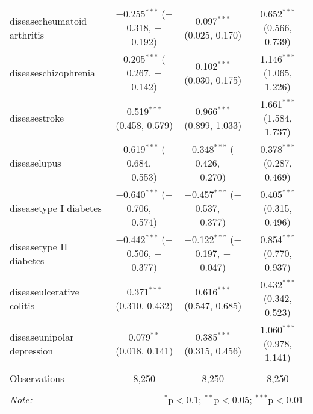 \begin{table}[!htbp]
\begin{tabular}{@{\extracolsep{5pt}}lccc}
  diseaserheumatoid arthritis & $-$0.255$^{***}$ ($-$0.318, $-$0.192) & 0.097$^{***}$ (0.025, 0.170) & 0.652$^{***}$ (0.566, 0.739) \\ 
  diseaseschizophrenia & $-$0.205$^{***}$ ($-$0.267, $-$0.142) & 0.102$^{***}$ (0.030, 0.175) & 1.146$^{***}$ (1.065, 1.226) \\ 
  diseasestroke & 0.519$^{***}$ (0.458, 0.579) & 0.966$^{***}$ (0.899, 1.033) & 1.661$^{***}$ (1.584, 1.737) \\ 
  diseaselupus & $-$0.619$^{***}$ ($-$0.684, $-$0.553) & $-$0.348$^{***}$ ($-$0.426, $-$0.270) & 0.378$^{***}$ (0.287, 0.469) \\ 
  diseasetype I diabetes & $-$0.640$^{***}$ ($-$0.706, $-$0.574) & $-$0.457$^{***}$ ($-$0.537, $-$0.377) & 0.405$^{***}$ (0.315, 0.496) \\ 
  diseasetype II diabetes & $-$0.442$^{***}$ ($-$0.506, $-$0.377) & $-$0.122$^{***}$ ($-$0.197, $-$0.047) & 0.854$^{***}$ (0.770, 0.937) \\ 
  diseaseulcerative colitis & 0.371$^{***}$ (0.310, 0.432) & 0.616$^{***}$ (0.547, 0.685) & 0.432$^{***}$ (0.342, 0.523) \\ 
  diseaseunipolar depression & 0.079$^{**}$ (0.018, 0.141) & 0.385$^{***}$ (0.315, 0.456) & 1.060$^{***}$ (0.978, 1.141) \\ 
 \hline \\[-1.8ex] 
Observations & 8,250 & 8,250 & 8,250 \\ 
\hline 
\hline \\[-1.8ex] 
\textit{Note:}  & \multicolumn{3}{r}{$^{*}$p$<$0.1; $^{**}$p$<$0.05; $^{***}$p$<$0.01} \\ 
\end{tabular} 
\end{table} 
